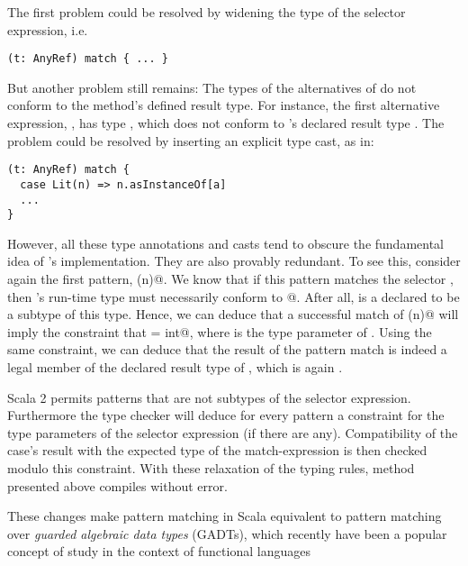 \documentclass[a4paper,11pt,twoside]{article}
\begin{document}
The first problem could be resolved by widening the type of the selector
expression, i.e.
\begin{lstlisting}
(t: AnyRef) match { ... }
\end{lstlisting}
But another problem still remains: The types of the alternatives of
\lstinline@eval@ do not conform to the method's defined result type.
For instance, the first alternative expression, \lstinline@n@, has
type \lstinline@int@, which does not conform to \lstinline@eval@'s
declared result type \lstinline@a@. The problem could be resolved by
inserting an explicit type cast, as in:
\begin{lstlisting}
(t: AnyRef) match { 
  case Lit(n) => n.asInstanceOf[a]
  ...
}
\end{lstlisting}
However, all these type annotations and casts tend to obscure the
fundamental idea of \lstinline@eval@'s implementation. They are also
provably redundant. To see this, consider again the first pattern,
\lstinline@Lit(n)@. We know that if this pattern matches the selector
\lstinline@t@, then \lstinline@t@'s run-time type must necessarily
conform to \lstinline@Term[int]@. After all, \lstinline@Lit@ is a
declared to be a subtype of this type. Hence, we can deduce that a
successful match of \lstinline@Lit(n)@ will imply the constraint that
\lstinline@a = int@, where \lstinline@a@ is the type parameter of
\lstinline@eval@. Using the same constraint, we can deduce that the
result \lstinline@n@ of the pattern match is indeed a legal member of
the declared result type of \lstinline@eval@, which is again
\lstinline@a@.

Scala 2 permits patterns that are not subtypes of the selector
expression. Furthermore the type checker will deduce for every pattern
a constraint for the type parameters of the selector
expression (if there are any). Compatibility of the case's result with the expected type
of the match-expression is then checked modulo this constraint.  With
these relaxation of the typing rules, method \lstinline@eval@
presented above compiles without error.

These changes make pattern matching in Scala equivalent to pattern
matching over {\em guarded algebraic data types} (GADTs), which
recently have been a popular concept of study in the context of
functional languages \cite{GRDC03}




\end{document}
